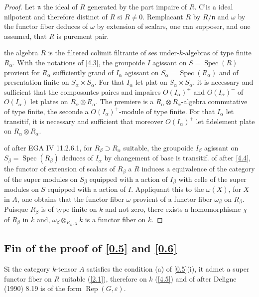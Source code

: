 \documentclass[11pt,a4paper]{article}
\theoremstyle{plain}
\theoremstyle{definition}
\DeclareMathOperator{\Spec}{Spec}
\newcommand{\Rep}{\operatorname{Rep}}
\begin{document}
\begin{proof}
Let $\mathfrak{n}$ the ideal of $R$ generated by the part impaire of $R$. C'is a ideal nilpotent and therefore distinct of $R$ si $R\neq0$. Remplacant $R$ by $R/\mathfrak{n}$ and $\omega$ by the functor fiber deduces of $\omega$ by extension of scalars, one can supposer, and one assumed, that $R$ is purement pair.

the algebra $R$ is the filtered colimit filtrante of ses under-$k$-algebras of type finite $R_\alpha$. With the notations of \ref{4.3}, the groupoide $I$ agissant on $S=\Spec(R)$ provient for $R_\alpha$ sufficiently grand of $I_\alpha$ agissant on $S_\alpha=\Spec(R_\alpha)$ and of presentation finite on $S_\alpha\times S_\alpha$. For that $I_\alpha$ let plat on $S_\alpha\times S_\alpha$, it is necessary and sufficient that the composantes paires and impaires $O(I_\alpha)^+$ and $O(I_\alpha)^-$ of $O(I_\alpha)$ let plates on $R_\alpha\otimes R_\alpha$. The premiere is a $R_\alpha\otimes R_\alpha$-algebra commutative of type finite, the seconde a $O(I_\alpha)^+$-module of type finite. For that $I_\alpha$ let transitif, it is necessary and sufficient that moreover $O(I_\alpha)^+$ let fidelement plate on $R_\alpha\otimes R_\alpha$.

of after EGA IV 11.2.6.1, for $R_\beta\supset R_\alpha$ suitable, the groupoide $I_\beta$ agissant on $S_\beta=\Spec(R_\beta)$ deduces of $I_\alpha$ by changement of base is transitif. of after \ref{4.4}, the functor of extension of scalars of $R_\beta$ a $R$ induces a equivalence of the category of the super modules on $S_\beta$ equipped with a action of $I_\beta$ with celle of the super modules on $S$ equipped with a action of $I$. Appliquant this to the $\omega(X)$, for $X$ in $A$, one obtains that the functor fiber $\omega$ provient of a functor fiber $\omega_\beta$ on $R_\beta$. Puisque $R_\beta$ is of type finite on $k$ and not zero, there exists a homomorphisme $\chi$ of $R_\beta$ in $k$ and, $\omega_\beta\otimes_{R_\beta,\chi}k$ is a functor fiber on $k$.
\end{proof}

\subsection{Fin of the proof of \ref{0.5} and \ref{0.6}}\label{4.6}

Si the category $k$-tensor $A$ satisfies the condition (a) of \ref{0.5}(i), it admet a super functor fiber on $R$ suitable (\ref{2.1}), therefore on $k$ (\ref{4.5}) and of after Deligne (1990) 8.19 is of the form $\Rep(G,\varepsilon)$.
\end{document}
